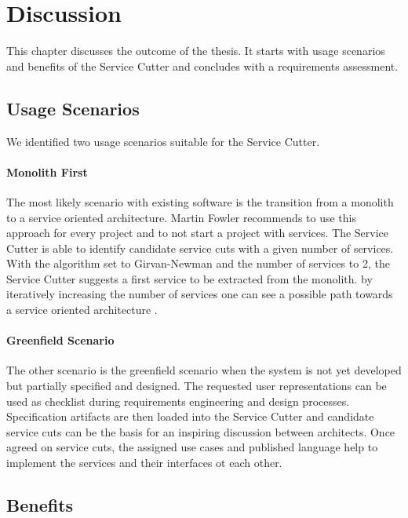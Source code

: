 \chapter{Discussion}

This chapter discusses the outcome of the thesis. It starts with usage scenarios and benefits of the Service Cutter and concludes with a requirements assessment.

\section{Usage Scenarios}

We identified two usage scenarios suitable for the Service Cutter.

\subsubsection{Monolith First}
\label{subsec:monolithFirst}

The most likely scenario with existing software is the transition from a monolith to a service oriented architecture. Martin Fowler recommends to use this approach for every project and to not start a project with services\cite{fowlerMonolithFirst}. The Service Cutter is able to identify candidate service cuts with a given number of services. With the algorithm set to Girvan-Newman and the number of services to 2, the Service Cutter suggests a first service to be extracted from the monolith. by iteratively increasing the number of services one can see a possible path towards a service oriented architecture .

\subsubsection{Greenfield Scenario}

The other scenario is the greenfield scenario when the system is not yet developed but partially specified and designed. The requested user representations can be used as checklist during requirements engineering and design processes. Specification artifacts are then loaded into the Service Cutter and candidate service cuts can be the basis for an inspiring discussion between architects. Once agreed on service cuts, the assigned use cases and published language help to implement the services and their interfaces ot each other. 

\section{Benefits}

